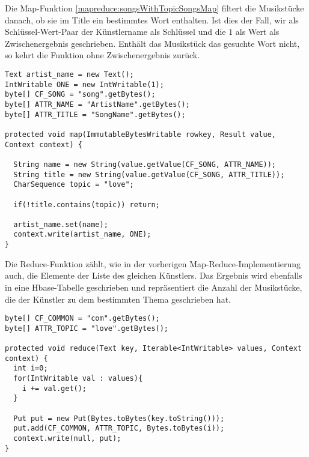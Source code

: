 Die Map-Funktion \ref{mapreduce:songsWithTopicSongsMap} filtert die Musikstücke danach, ob sie im Title ein bestimmtes Wort enthalten.
Ist dies der Fall, wir als Schlüssel-Wert-Paar der Künstlername als Schlüssel und die $1$ als 
Wert als Zwischenergebnis geschrieben. Enthält das Musikstück das gesuchte Wort nicht,
so kehrt die Funktion ohne Zwischenergebnis zurück.

\begin{lstlisting}[caption={Map-Funktion zur Suche nach Musikstücken eines Themas}, label=mapreduce:songsWithTopicSongsMap]
Text artist_name = new Text();
IntWritable ONE = new IntWritable(1);
byte[] CF_SONG = "song".getBytes();
byte[] ATTR_NAME = "ArtistName".getBytes();
byte[] ATTR_TITLE = "SongName".getBytes();
        
protected void map(ImmutableBytesWritable rowkey, Result value, Context context) {
            
  String name = new String(value.getValue(CF_SONG, ATTR_NAME));
  String title = new String(value.getValue(CF_SONG, ATTR_TITLE));          
  CharSequence topic = "love";
            
  if(!title.contains(topic)) return;
            
  artist_name.set(name);
  context.write(artist_name, ONE);
}
\end{lstlisting}

Die Reduce-Funktion zählt, wie in der vorherigen Map-Reduce-Implementierung auch, die Elemente der Liste des gleichen Künstlers.
Das Ergebnis wird ebenfalls in eine Hbase-Tabelle geschrieben und repräsentiert die Anzahl der Musikstücke, die der
Künstler zu dem bestimmten Thema geschrieben hat.

\begin{lstlisting}[caption={Reduce-Funktion zur Suche nach Musikstücken eines Themas}, label=mapreduce:songsWithTopicSongsReduce]
byte[] CF_COMMON = "com".getBytes();
byte[] ATTR_TOPIC = "love".getBytes();

protected void reduce(Text key, Iterable<IntWritable> values, Context context) {
  int i=0;
  for(IntWritable val : values){
    i += val.get();
  }
            
  Put put = new Put(Bytes.toBytes(key.toString()));
  put.add(CF_COMMON, ATTR_TOPIC, Bytes.toBytes(i));
  context.write(null, put);
}
\end{lstlisting}